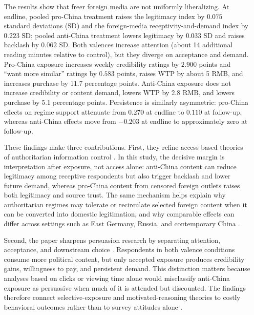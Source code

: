 \documentclass[12pt,american]{article}
\begin{document}
	The results show that freer foreign media are not uniformly liberalizing. At endline, pooled pro-China treatment raises the legitimacy index by \(0.075\) standard deviations (SD) and the foreign-media receptivity-and-demand index by \(0.223\) SD; pooled anti-China treatment lowers legitimacy by \(0.033\) SD and raises backlash by \(0.062\) SD. Both valences increase attention (about 14 additional reading minutes relative to control), but they diverge on acceptance and demand. Pro-China exposure increases weekly credibility ratings by \(2.900\) points and ``want more similar'' ratings by \(0.583\) points, raises WTP by about 5 RMB, and increases purchase by 11.7 percentage points. Anti-China exposure does not increase credibility or content demand, lowers WTP by 2.8 RMB, and lowers purchase by 5.1 percentage points. Persistence is similarly asymmetric: pro-China effects on regime support attenuate from \(0.270\) at endline to \(0.110\) at follow-up, whereas anti-China effects move from \(-0.203\) at endline to approximately zero at follow-up.
	
These findings make three contributions. First, they refine access-based theories of authoritarian information control \citep{BesleyPrat2006,gurievtreisman2019,roberts2018,RosenfeldWallace2024}. In this study, the decisive margin is interpretation after exposure, not access alone: anti-China content can reduce legitimacy among receptive respondents but also trigger backlash and lower future demand, whereas pro-China content from censored foreign outlets raises both legitimacy and source trust. The same mechanism helps explain why authoritarian regimes may tolerate or recirculate selected foreign content when it can be converted into domestic legitimation, and why comparable effects can differ across settings such as East Germany, Russia, and contemporary China \citep{KernHainmueller2009,EnikolopovPetrovaZhuravskaya2011,QinStrombergWu2017,kingpanroberts2013}.

Second, the paper sharpens persuasion research by separating attention, acceptance, and downstream choice \citep{ArceneauxJohnson2013,Prior2007CUP,zaller1992,taberlodge2006,ValloneRossLepper1985,Levendusky2013}. Respondents in both valence conditions consume more political content, but only accepted exposure produces credibility gains, willingness to pay, and persistent demand. This distinction matters because analyses based on clicks or viewing time alone would misclassify anti-China exposure as persuasive when much of it is attended but discounted. The findings therefore connect selective-exposure and motivated-reasoning theories to costly behavioral outcomes rather than to survey attitudes alone \citep{BakshyMessingAdamic2015,FlaxmanGoelRao2016,GonzalezBailonEtAl2023,KangSheen2025,shen2025forced}.
\end{document}
